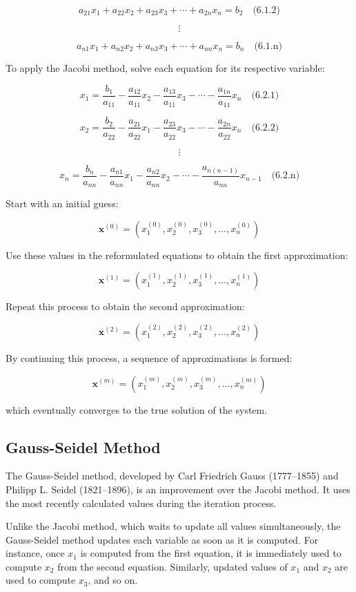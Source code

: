 \documentclass[a4paper,12pt]{article}
\begin{document}
$$
a_{21}x_1 + a_{22}x_2 + a_{23}x_3 + \cdots + a_{2n}x_n = b_2 \quad \text{(6.1.2)}
$$

$$
\vdots
$$

$$
a_{n1}x_1 + a_{n2}x_2 + a_{n3}x_3 + \cdots + a_{nn}x_n = b_n \quad \text{(6.1.n)}
$$

To apply the Jacobi method, solve each equation for its respective variable:

$$
x_1 = \frac{b_1}{a_{11}} - \frac{a_{12}}{a_{11}}x_2 - \frac{a_{13}}{a_{11}}x_3 - \cdots - \frac{a_{1n}}{a_{11}}x_n \quad \text{(6.2.1)}
$$

$$
x_2 = \frac{b_2}{a_{22}} - \frac{a_{21}}{a_{22}}x_1 - \frac{a_{23}}{a_{22}}x_3 - \cdots - \frac{a_{2n}}{a_{22}}x_n \quad \text{(6.2.2)}
$$

$$
\vdots
$$

$$
x_n = \frac{b_n}{a_{nn}} - \frac{a_{n1}}{a_{nn}}x_1 - \frac{a_{n2}}{a_{nn}}x_2 - \cdots - \frac{a_{n(n-1)}}{a_{nn}}x_{n-1} \quad \text{(6.2.n)}
$$

Start with an initial guess:

$$
\mathbf{x}^{(0)} = \left( x_1^{(0)}, x_2^{(0)}, x_3^{(0)}, \ldots, x_n^{(0)} \right)
$$

Use these values in the reformulated equations to obtain the first approximation:

$$
\mathbf{x}^{(1)} = \left( x_1^{(1)}, x_2^{(1)}, x_3^{(1)}, \ldots, x_n^{(1)} \right)
$$

Repeat this process to obtain the second approximation:

$$
\mathbf{x}^{(2)} = \left( x_1^{(2)}, x_2^{(2)}, x_3^{(2)}, \ldots, x_n^{(2)} \right)
$$

By continuing this process, a sequence of approximations is formed:

$$
\mathbf{x}^{(m)} = \left( x_1^{(m)}, x_2^{(m)}, x_3^{(m)}, \ldots, x_n^{(m)} \right)
$$

which eventually converges to the true solution of the system.

\subsection{Gauss-Seidel Method}

The Gauss-Seidel method, developed by Carl Friedrich Gauss (1777–1855) and Philipp L. Seidel (1821–1896), is an improvement over the Jacobi method. It uses the most recently calculated values during the iteration process.

Unlike the Jacobi method, which waits to update all values simultaneously, the Gauss-Seidel method updates each variable as soon as it is computed. For instance, once $x_1$ is computed from the first equation, it is immediately used to compute $x_2$ from the second equation. Similarly, updated values of $x_1$ and $x_2$ are used to compute $x_3$, and so on.
\end{document}
